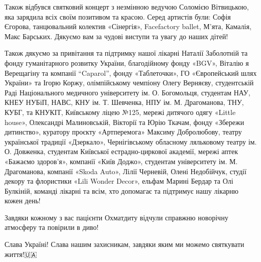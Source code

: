 Також відбувся святковий концерт з незмінною ведучою Соломією Вітвицькою, яка
зарядила всіх своїм позитивом та красою. Серед артистів були: Софія Єгорова,
танцювальний колектив «Сінергія», Facefactory ballet, М'ята, Камалія, Макс
Барських. Дякуємо вам за чудові виступи та увагу до наших дітей!💫

Також дякуємо за привітання та підтримку нашої лікарні Наталії Заболотній та
фонду гуманітарного розвитку України, благодійному фонду «BGV», Віталію я
Верещагіну та компанії “Caparol”, фонду «Таблеточки», ГО «Європейський шлях
України» та Ігорю Коржу, олімпійському чемпіону Олегу Верняєву, студентській
Раді Національного медичного університету ім. О. Богомольця, студентам НАУ,
КНЕУ НУБіП, НАВС, КНУ ім. Т. Шевченка, НПУ ім. М. Драгоманова, ТНУ, КУБГ, та
КНУКІТ, Київському ліцею №125, мережі дитячого одягу «Little house», Олександрі
Малиновській, Вікторії та Юрію Ткачам, фонду «Збережи дитинство», куратору
проєкту «Артперемога» Максиму Добролюбову, театру української традиції
«Дзеркало», Чернігівському обласному ляльковому театру ім. О. Довженка,
студентам Київської естрадно-циркової академії, мережі аптек «Бажаємо
здоров'я», компанії «Київ Доджо», студентам університету ім. М. Драгоманова,
компанії «Skoda Auto», Лілії Черневій, Олені Недобійчук, студії декору та
флористики «Lili Wonder Decor», ельфам Марині Бердар та Олі Булкіній, команді
лікарні та всім, хто допомагає та підтримує нашу лікарню кожен день!🙌

Завдяки кожному з вас пацієнти Охматдиту відчули справжню новорічну атмосферу
та повірили в диво!

Слава Україні! Слава нашим захисникам, завдяки яким ми можемо святкувати
життя!🇺🇦

